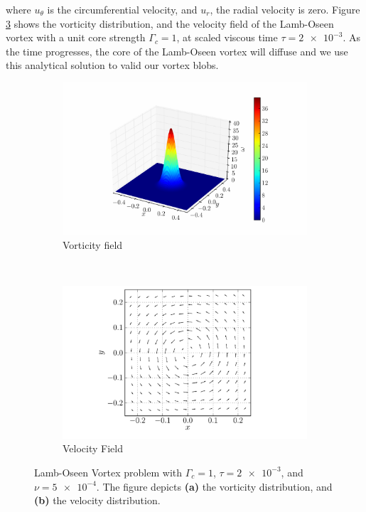 where $u_{\theta}$ is the circumferential velocity, and $u_r$, the radial velocity is zero. Figure \ref{fig:lambOseen_distributions} shows the vorticity distribution, and the velocity field of the Lamb-Oseen vortex with a unit core strength $\Gamma_c=1$, at scaled viscous time $\tau=\num{2e-3}$. As the time progresses, the core of the Lamb-Oseen vortex will diffuse and we use this analytical solution to valid our vortex blobs.

	\begin{figure}[!t]
        \centering
        \begin{subfigure}[b]{0.5\textwidth}
                \includegraphics[width=\textwidth]{figures/lagrangian/lambOseen_vorticityDistribution_compressed.pdf}
                \caption{Vorticity field}
                \label{fig:lambOseen_vorticityDistribution}
        \end{subfigure}%
        ~ %
        \begin{subfigure}[b]{0.5\textwidth}
                \includegraphics[width=\textwidth]{figures/lagrangian/lambOseen_velocityDistribution_compressed.pdf}
                \caption{Velocity Field}
                \label{fig:lambOseen_velocityDistribution}
        \end{subfigure}
        \caption{Lamb-Oseen Vortex problem with $\Gamma_c = 1$, $\tau=\num{2e-3}$, and $\nu=\num{5e-4}$. The figure depicts \textbf{(a)} the vorticity distribution, and \textbf{(b)} the velocity distribution.}
        \label{fig:lambOseen_distributions}
	\end{figure}

